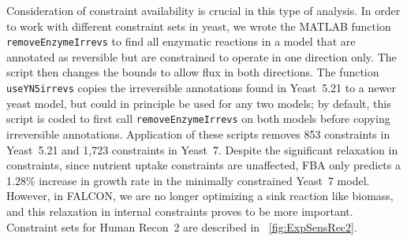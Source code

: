 Consideration of constraint availability is crucial in this type of
analysis. In order to work with different constraint sets in yeast, we
wrote the MATLAB function \texttt{removeEnzymeIrrevs} to find all
enzymatic reactions in a model that are annotated as reversible but
are constrained to operate in one direction only. The script then
changes the bounds to allow flux in both directions. The function
\texttt{useYN5irrevs} copies the irreversible annotations found in
Yeast~5.21 \citep{Lee2012} to a newer yeast model, but could in
principle be used for any two models; by default, this script is coded
to first call \texttt{removeEnzymeIrrevs} on both models before
copying irreversible annotations. Application of these scripts removes
853 constraints in Yeast~5.21 and 1,723 constraints in Yeast~7.
Despite the significant relaxation in constraints, since nutrient
uptake constraints are unaffected, FBA only predicts a 1.28\% increase
in growth rate in the minimally constrained Yeast~7 model. However, in
FALCON, we are no longer optimizing a sink reaction like biomass, and
this relaxation in internal constraints proves to be more important.
Constraint sets for Human Recon~2 are described in \suppOrApp 
\Fig~\ref{fig:ExpSensRec2}.

